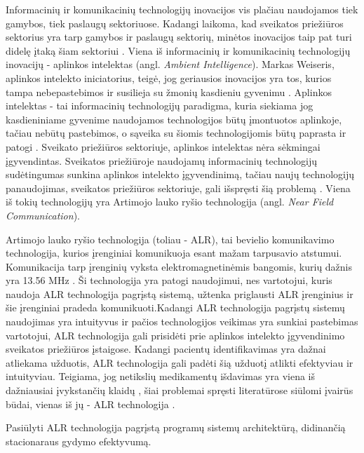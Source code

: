 Informacinių ir komunikacinių technologijų inovacijos vis plačiau naudojamos tiek gamybos, tiek paslaugų sektoriuose. Kadangi laikoma, kad sveikatos priežiūros sektorius yra tarp gamybos ir paslaugų sektorių, minėtos inovacijos taip pat turi didelę įtaką šiam sektoriui \cite{Puma2012}. Viena iš informacinių ir komunikacinių technologijų inovacijų - aplinkos intelektas (angl. \textit{Ambient Intelligence}). Markas Weiseris, aplinkos intelekto iniciatorius, teigė, jog geriausios inovacijos yra tos, kurios tampa nebepastebimos ir susilieja su žmonių kasdieniu gyvenimu \cite{Cook2009}. Aplinkos intelektas - tai informacinių technologijų paradigma, kuria siekiama jog kasdieniniame gyvenime naudojamos technologijos būtų įmontuotos aplinkoje, tačiau nebūtų pastebimos, o sąveika su šiomis technologijomis būtų paprasta ir patogi \cite{Bravo2008}. Sveikato priežiūros sektoriuje, aplinkos intelektas nėra sėkmingai įgyvendintas. Sveikatos priežiūroje naudojamų informacinių technologijų sudėtingumas sunkina aplinkos intelekto įgyvendinimą, tačiau naujų technologijų panaudojimas, sveikatos priežiūros sektoriuje, gali išspręsti šią problemą \cite{Fontecha2011}. Viena iš tokių technologijų yra Artimojo lauko ryšio technologija (angl. \textit{Near Field Communication}). 

Artimojo lauko ryšio technologija (toliau - ALR), tai bevielio komunikavimo technologija, kurios įrenginiai komunikuoja esant mažam tarpusavio atstumui. Komunikacija tarp įrenginių vyksta elektromagnetinėmis bangomis, kurių dažnis yra 13.56 MHz \cite{Leora1980}. Ši technologija yra patogi naudojimui, nes vartotojui, kuris naudoja ALR technologija pagrįstą sistemą, užtenka priglausti ALR įrenginius ir šie įrenginiai pradeda komunikuoti.Kadangi ALR technologija pagrįstų sistemų naudojimas yra intuityvus ir pačios technologijos veikimas yra sunkiai pastebimas vartotojui, ALR technologija gali prisidėti prie aplinkos intelekto įgyvendinimo sveikatos priežiūros įstaigose. Kadangi pacientų identifikavimas yra dažnai atliekama užduotis, ALR technologija gali padėti šią užduotį atlikti efektyviau ir intuityviau. Teigiama, jog netikslių medikamentų išdavimas yra viena iš dažniausiai įvykstančių klaidų \cite{Agrawal2009}, šiai problemai spręsti literatūrose siūlomi įvairūs būdai, vienas iš jų - ALR technologija \cite{Gautam}.



Pasiūlyti ALR technologija pagrįstą programų sistemų architektūrą, didinančią stacionaraus gydymo efektyvumą.
    
